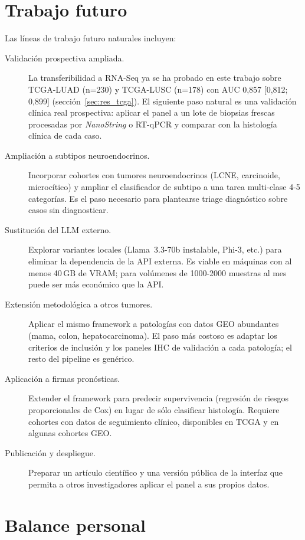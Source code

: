 \section{Trabajo futuro}
\label{sec:conc_futuro}

Las líneas de trabajo futuro naturales incluyen:

\begin{description}
  \item[Validación prospectiva ampliada.] La transferibilidad a RNA-Seq
  ya se ha probado en este trabajo sobre TCGA-LUAD (n=230) y TCGA-LUSC
  (n=178) con AUC 0,857 [0,812; 0,899] (sección~\ref{sec:res_tcga}). El
  siguiente paso natural es una validación clínica real prospectiva:
  aplicar el panel a un lote de biopsias frescas procesadas por
  \emph{NanoString} o RT-qPCR y comparar con la histología clínica de
  cada caso.
  \item[Ampliación a subtipos neuroendocrinos.] Incorporar cohortes con
  tumores neuroendocrinos (LCNE, carcinoide, microcítico) y ampliar el
  clasificador de subtipo a una tarea multi-clase 4-5 categorías. Es el
  paso necesario para plantearse triage diagnóstico sobre casos sin
  diagnosticar.
  \item[Sustitución del LLM externo.] Explorar variantes locales
  (Llama~3.3-70b instalable, Phi-3, etc.) para eliminar la dependencia
  de la API externa. Es viable en máquinas con al menos 40\,GB de VRAM;
  para volúmenes de 1000-2000 muestras al mes puede ser más económico
  que la API.
  \item[Extensión metodológica a otros tumores.] Aplicar el mismo
  framework a patologías con datos GEO abundantes (mama, colon,
  hepatocarcinoma). El paso más costoso es adaptar los criterios de
  inclusión y los paneles IHC de validación a cada patología; el resto
  del pipeline es genérico.
  \item[Aplicación a firmas pronósticas.] Extender el framework para
  predecir supervivencia (regresión de riesgos proporcionales de Cox) en
  lugar de sólo clasificar histología. Requiere cohortes con datos de
  seguimiento clínico, disponibles en TCGA y en algunas cohortes GEO.
  \item[Publicación y despliegue.] Preparar un artículo científico y una
  versión pública de la interfaz que permita a otros investigadores
  aplicar el panel a sus propios datos.
\end{description}

\section{Balance personal}
\label{sec:conc_balance}

